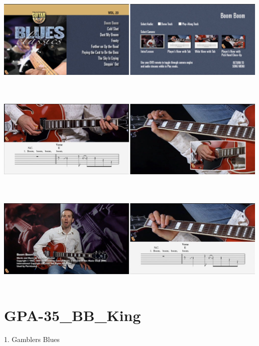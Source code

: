 \documentclass[a4paper]{book}
\begin{document}
\begin{center}
\includegraphics[width=17cm,height=4.78cm]{lebluessupportsmethodes-img68.jpg}
\end{center}





\begin{center}
\includegraphics[width=17cm,height=4.78cm]{lebluessupportsmethodes-img69.jpg}
\end{center}


\begin{center}
\includegraphics[width=17cm,height=4.78cm]{lebluessupportsmethodes-img70.jpg}
\end{center}



\clearpage\section[GPA{}-35\_BB\_King]{GPA-35\_BB\_King}
\hypertarget{RefHeadingToc138973218262}{}1. Gambler{\textquotesingle}s
Blues
\end{document}
